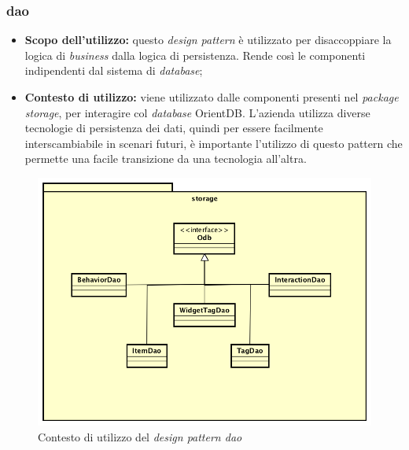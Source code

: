 \subsubsection{\gls{dao}}
\begin{itemize}
\item\textbf{Scopo dell'utilizzo:} questo \emph{design pattern} è utilizzato per disaccoppiare la logica di \emph{business} dalla logica di persistenza. Rende così le componenti indipendenti dal sistema di \emph{database};
\item \textbf{Contesto di utilizzo:} viene utilizzato dalle componenti presenti nel \emph{package storage}, per interagire col \emph{database} OrientDB. L'azienda utilizza diverse tecnologie di persistenza dei dati, quindi per essere facilmente interscambiabile in scenari futuri, è importante l'utilizzo di questo pattern che permette una facile transizione da una tecnologia all'altra.
\end{itemize}
\begin{figure}[h]
\centering
\includegraphics[scale=0.30]{immagini/storage}
\caption{Contesto di utilizzo del \emph{design pattern \gls{dao}}}
\label{fig:pattern-dao}
\end{figure}
\newpage
